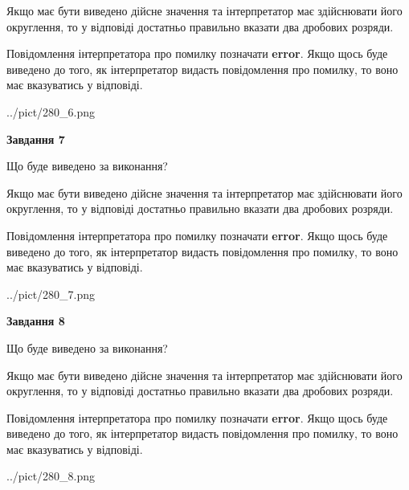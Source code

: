 \documentclass[12pt, ukrainian]{article}
\begin{document}
{\begin {Large}
Якщо має бути виведено дійсне значення та інтерпретатор має здійснювати його округлення, 
то у відповіді достатньо правильно вказати два дробових розряди.

Повідомлення інтерпретатора про помилку позначати \textbf{error}.
Якщо щось буде виведено до того, як інтерпретатор видасть повідомлення про помилку, 
то воно має вказуватись у відповіді. \par

\begin{center}
	{../pict/280_6.png}
\end{center}
\newpage

{\begin {center}\textbf{Завдання 7}\end {center}}\par
Що буде виведено за виконання? \par

Якщо має бути виведено дійсне значення та інтерпретатор має здійснювати його округлення, 
то у відповіді достатньо правильно вказати два дробових розряди.

Повідомлення інтерпретатора про помилку позначати \textbf{error}.
Якщо щось буде виведено до того, як інтерпретатор видасть повідомлення про помилку, 
то воно має вказуватись у відповіді. \par

\begin{center}
	{../pict/280_7.png}
\end{center}
\newpage

{\begin {center}\textbf{Завдання 8}\end {center}}\par
Що буде виведено за виконання? \par

Якщо має бути виведено дійсне значення та інтерпретатор має здійснювати його округлення, 
то у відповіді достатньо правильно вказати два дробових розряди.

Повідомлення інтерпретатора про помилку позначати \textbf{error}.
Якщо щось буде виведено до того, як інтерпретатор видасть повідомлення про помилку, 
то воно має вказуватись у відповіді. \par

\begin{center}
	{../pict/280_8.png}
\end{center}
\newpage


\end{Large}}
\end{document}

